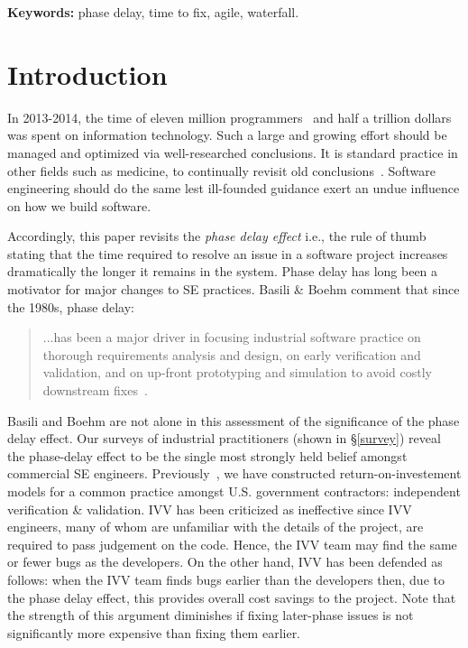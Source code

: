 \documentclass{sig-alternate}
\begin{document}
 

\vspace{1mm}
\noindent
{\bf Keywords:} phase delay, time to fix, agile, waterfall.

\section{Introduction}
In 2013-2014, the time of 
eleven  million programmers~\cite{pettey14} and
half a trillion dollars~\cite{avram14} was spent on information technology.
Such a large and growing effort should be managed and optimized via  well-researched conclusions.  
It is standard practice
in other fields such as medicine,
to continually revisit old conclusions~\cite{prasad13}. Software engineering should do the same lest
ill-founded guidance exert an undue influence on how we build software.  

Accordingly, this paper revisits
the {\em phase delay effect}
i.e.,  the rule of thumb stating that the time required to resolve an issue in a software project increases dramatically 
the longer it remains in the system. 
Phase delay has long been
a    motivator for major changes to
SE practices. Basili \& Boehm comment that since the 1980s,  phase delay:
\begin{quote}
...has been a major driver in focusing
industrial software practice on thorough
requirements analysis and design,
on early verification and validation, and
on up-front prototyping and simulation
to avoid costly downstream fixes~\cite{boehm01}.
\end{quote}
Basili and Boehm are not alone in this assessment of the significance of the phase delay effect. Our surveys of industrial practitioners (shown in \S\ref{survey}) reveal the phase-delay effect to be
the single most strongly held belief amongst commercial SE engineers.
Previously~\cite{me08a}, we have constructed return-on-investement models
for a common practice amongst U.S. government contractors: 
independent verification \& validation. IVV has been criticized as
ineffective since IVV engineers, many of whom are unfamiliar with the details of the project, are required to pass judgement on the code.
Hence,  the IVV team may find the same or fewer bugs
as the developers.
On the other hand, IVV has been defended
as follows:  when the IVV team finds bugs earlier than the developers then, due to the phase delay effect, this provides overall cost savings to the project. Note that the strength of this argument diminishes
if fixing later-phase issues is not significantly more expensive than fixing them earlier. 
\end{document}
